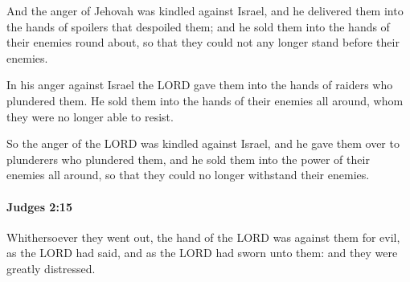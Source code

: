 			\begin{versebox}
					\item[BHS] 
					\item[ASV] And the anger of Jehovah was kindled against Israel, and he delivered them into the hands of spoilers that despoiled them; and he sold them into the hands of their enemies round about, so that they could not any longer stand before their enemies.
					\item[NIV] In his anger against Israel the LORD gave them into the hands of raiders who plundered them. He sold them into the hands of their enemies all around, whom they were no longer able to resist.
					\item[NRSV] So the anger of the LORD was kindled against Israel, and he gave them over to plunderers who plundered them, and he sold them into the power of their enemies all around, so that they could no longer withstand their enemies.
			\end{versebox}

		\paragraph{Judges 2:15} %
			\label{JUDGES-2-15}

			Whithersoever they went out, the hand of the LORD was against them for evil, as the LORD had said, and as the LORD had sworn unto them: and they were greatly distressed.

